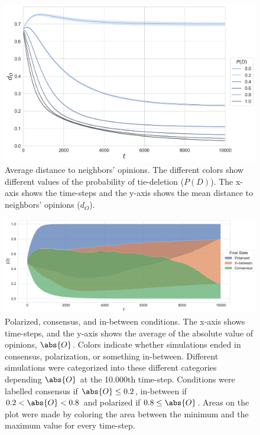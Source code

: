 \documentclass[11pt]{article}
\DeclarePairedDelimiter{\abs}\lvert\rvert
\begin{document}
\begin{figure}[H]
    \centering
    \includegraphics[width=.7\linewidth]{../plots/overall/Distance_Tie_Deletion.png}
  \caption{Average distance to neighbors' opinions. The different colors show different values of the probability of tie-deletion ($P(D)$). The x-axis shows the time-steps and the y-axis shows the mean distance to neighbors' opinions ($d_O$). }
  \label{appendix:distance}
\end{figure}

\begin{figure}[H]
    \centering
    \includegraphics[width=.98\linewidth]{../plots/overall/Point_Of_No_Return.png}
  \caption{Polarized, consensus, and in-between conditions. The x-axis shows time-steps, and the y-axis shows the average of the absolute value of opinions, $\abs{O}$. Colors indicate whether simulations ended in consensus, polarization, or something in-between. Different simulations were categorized into these different categories depending $\abs{O}$ at the 10.000th time-step. Conditions were labelled consensus if $\abs{O} \leq 0.2$, in-between if $0.2 < \abs{O} < 0.8$ and polarized if $0.8 \leq \abs{O}$. Areas on the plot were made by coloring the area between the minimum and the maximum value for every time-step.}
  \label{appendix:ponr}
\end{figure}
\end{document}
